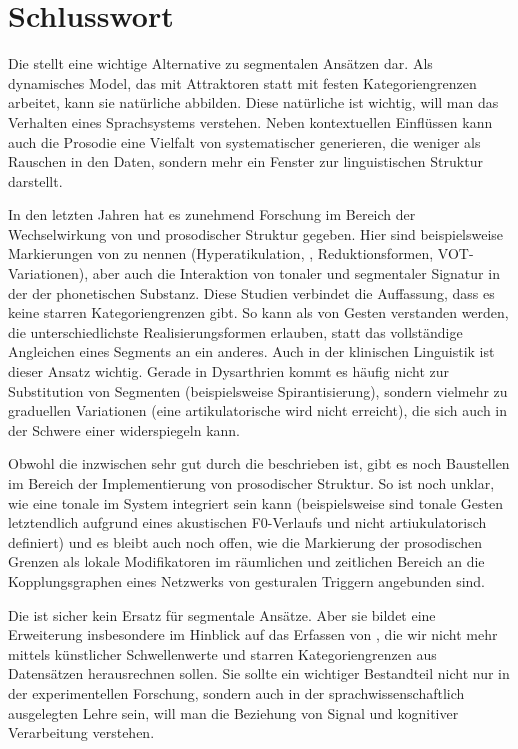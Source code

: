 \chapter{{Schlusswort}}
\label{chap:09}

Die  stellt eine wichtige Alternative zu segmentalen Ansätzen dar. Als dynamisches Model, das mit Attraktoren statt mit festen Kategoriengrenzen arbeitet, kann sie natürliche  abbilden. Diese natürliche  ist wichtig, will man das Verhalten eines Sprachsystems verstehen. Neben kontextuellen Einflüssen kann auch die Prosodie eine Vielfalt von systematischer  generieren, die weniger als Rauschen in den Daten, sondern mehr ein Fenster zur linguistischen Struktur darstellt.

In den letzten Jahren hat es zunehmend Forschung im Bereich der Wechselwirkung von  und prosodischer Struktur gegeben. Hier sind beispielsweise Markierungen von  zu nennen (Hyperatikulation, , Reduktionsformen, VOT-Variationen), aber auch die Interaktion von tonaler und segmentaler Signatur in der der phonetischen Substanz. Diese Studien verbindet die Auffassung, dass es keine starren Kategoriengrenzen gibt. So kann  als  von Gesten verstanden werden, die unterschiedlichste Realisierungsformen erlauben, statt das vollständige Angleichen eines Segments an ein anderes. Auch in der klinischen Linguistik ist dieser Ansatz wichtig. Gerade in Dysarthrien kommt es häufig nicht zur Substitution von Segmenten (beispielsweise Spirantisierung), sondern vielmehr zu graduellen Variationen (eine artikulatorische  wird nicht erreicht), die sich auch in der Schwere einer  widerspiegeln kann.

Obwohl die  inzwischen sehr gut durch die  beschrieben ist, gibt es noch Baustellen im Bereich der Implementierung von prosodischer Struktur. So ist noch unklar, wie eine tonale  im System integriert sein kann (beispielsweise sind tonale Gesten letztendlich aufgrund eines akustischen F0-Verlaufs und nicht artiukulatorisch definiert) und es bleibt auch noch offen, wie die Markierung der prosodischen Grenzen als lokale Modifikatoren im räumlichen und zeitlichen Bereich an die Kopplungsgraphen eines Netzwerks von gesturalen Triggern angebunden sind.

Die  ist sicher kein Ersatz für segmentale Ansätze. Aber sie bildet eine Erweiterung insbesondere im Hinblick auf das Erfassen von , die wir nicht mehr mittels künstlicher Schwellenwerte und starren Kategoriengrenzen aus Datensätzen herausrechnen sollen. Sie sollte ein wichtiger Bestandteil nicht nur in der experimentellen Forschung, sondern auch in der sprachwissenschaftlich ausgelegten Lehre sein, will man die Beziehung von Signal und kognitiver Verarbeitung verstehen.
